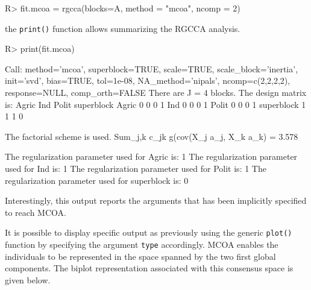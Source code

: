 \documentclass[
]{jss}
\begin{document}
\footnotesize

\begin{CodeChunk}
\begin{CodeInput}
R> fit.mcoa = rgcca(blocks=A, method = "mcoa", ncomp = 2)
\end{CodeInput}
\end{CodeChunk}

\normalsize

the \texttt{print()} function allows summarizing the RGCCA analysis.

\footnotesize

\begin{CodeChunk}
\begin{CodeInput}
R> print(fit.mcoa)
\end{CodeInput}
\begin{CodeOutput}
Call: method='mcoa', superblock=TRUE, scale=TRUE, scale_block='inertia', init='svd',
bias=TRUE, tol=1e-08, NA_method='nipals', ncomp=c(2,2,2,2), response=NULL,
comp_orth=FALSE 
There are J = 4 blocks.
The design matrix is:
           Agric Ind Polit superblock
Agric          0   0     0          1
Ind            0   0     0          1
Polit          0   0     0          1
superblock     1   1     1          0

The factorial scheme is used.
Sum_{j,k} c_jk g(cov(X_j a_j, X_k a_k) = 3.578 

The regularization parameter used for Agric is: 1
The regularization parameter used for Ind is: 1
The regularization parameter used for Polit is: 1
The regularization parameter used for superblock is: 0
\end{CodeOutput}
\end{CodeChunk}

\normalsize

Interestingly, this output reports the arguments that has been
implicitly specified to reach MCOA.

It is possible to display specific output as previously using the
generic \texttt{plot()} function by specifying the argument
\texttt{type} accordingly. MCOA enables the individuals to be
represented in the space spanned by the two first global components. The
biplot representation associated with this consensus space is given
below.

\footnotesize
\end{document}

